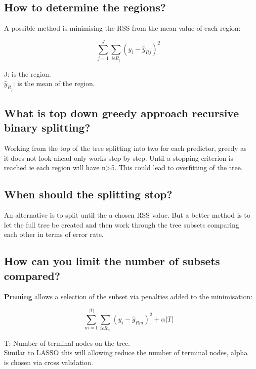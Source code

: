 \documentclass[11pt]{scrartcl} %
\begin{document}
\subsection{How to determine the regions?}

A possible method is minimising the RSS from the mean value of each region:

\begin{equation}
	\sum^J_{j=1}\sum_{i\epsilon R_j}{(y_i-\hat{y}_{Rj})}^2
\end{equation}

J: is the region.\\
\(\hat{y}_{R_j}\): is the mean of the region.

\subsection{What is top down greedy approach recursive binary splitting?}

Working from the top of the tree splitting into two for each predictor, greedy as it does not
look ahead only works step by step. Until a stopping criterion is reached ie each region will have
n>5. This could lead to overfitting of the tree.

\subsection{When should the splitting stop?}

An alternative is to split until the a chosen RSS value. But a better method is to let the full 
tree be created and then work through the tree subsets comparing each other in terms of error rate.

\subsection{How can you limit the number of subsets compared?}

\textbf{Pruning} allows a selection of the subset via penalties added to the minimisation:

\begin{equation}
	\sum^{|T|}_{m=1}\sum_{i\epsilon R_m}{(y_i-\hat{y}_{Rm})}^2 + \alpha|T| 
\end{equation}

T: Number of terminal nodes on the tree.\\

Similar to LASSO this will allowing reduce the number of terminal nodes, alpha is chosen via cross
validation.
\end{document}
